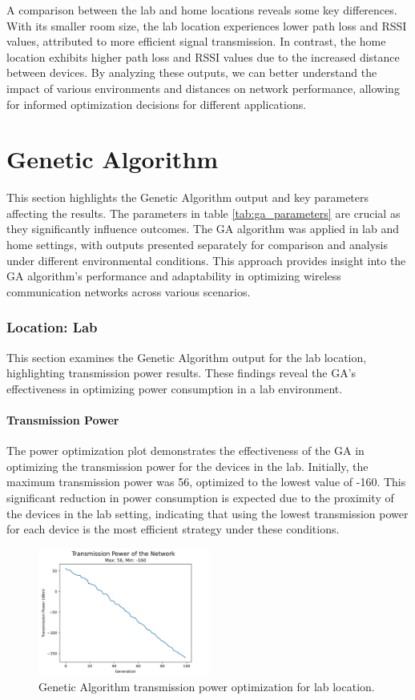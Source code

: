A comparison between the lab and home locations reveals some key differences. With its smaller room size, the lab location experiences lower path loss and RSSI values, attributed to more efficient signal transmission. In contrast, the home location exhibits higher path loss and RSSI values due to the increased distance between devices. By analyzing these outputs, we can better understand the impact of various environments and distances on network performance, allowing for informed optimization decisions for different applications.


\section{Genetic Algorithm}\label{sec:genetic_algorithm_output}
This section highlights the Genetic Algorithm output and key parameters affecting the results. The parameters in table \ref{tab:ga_parameters} are crucial as they significantly influence outcomes. The GA algorithm was applied in lab and home settings, with outputs presented separately for comparison and analysis under different environmental conditions. This approach provides insight into the GA algorithm's performance and adaptability in optimizing wireless communication networks across various scenarios.


\subsubsection{Location: Lab}
This section examines the Genetic Algorithm output for the lab location, highlighting transmission power results. These findings reveal the GA's effectiveness in optimizing power consumption in a lab environment.

\paragraph{Transmission Power}
The power optimization plot demonstrates the effectiveness of the GA in optimizing the transmission power for the devices in the lab. Initially, the maximum transmission power was 56, optimized to the lowest value of -160. This significant reduction in power consumption is expected due to the proximity of the devices in the lab setting, indicating that using the lowest transmission power for each device is the most efficient strategy under these conditions.

\begin{figure}[H]
  \centering
  \includegraphics[width=0.5\textwidth]{images/research_results/genetic_algorithm_lab_power.png}
    \caption{Genetic Algorithm transmission power optimization for lab location.}
    \label{fig:genetic_algorithm_lab_power}
\end{figure}

